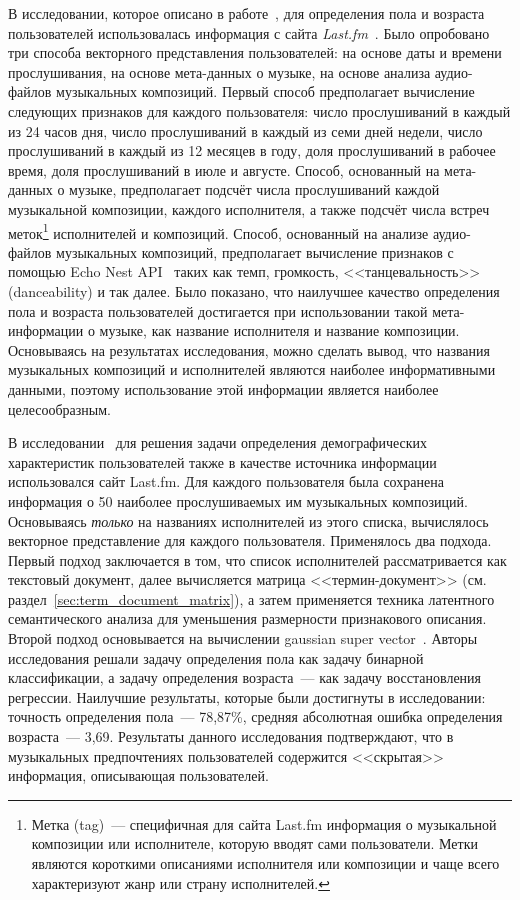 В исследовании, которое описано в работе~\cite{liu2012inferring},
для определения пола и возраста пользователей использовалась информация
с сайта \textit{Last.fm}~\cite{lastfm}. Было опробовано три
способа векторного представления пользователей: на основе даты и
времени прослушивания, на основе мета-данных о музыке, на основе
анализа аудио-файлов музыкальных композиций. Первый способ
предполагает вычисление следующих признаков для каждого пользователя:
число прослушиваний в каждый из 24 часов дня, число прослушиваний
в каждый из семи дней недели, число прослушиваний в каждый из 12 месяцев
в году, доля прослушиваний в рабочее время, доля прослушиваний в июле и августе.
Способ, основанный на мета-данных о музыке, предполагает подсчёт числа
прослушиваний каждой музыкальной композиции, каждого исполнителя, а также
подсчёт числа встреч меток\footnote{Метка (tag)~--- специфичная для сайта
Last.fm информация о музыкальной композиции или исполнителе, которую
вводят сами пользователи. Метки являются короткими описаниями исполнителя 
или композиции и чаще всего характеризуют жанр или страну
исполнителей.} исполнителей и композиций. Способ, основанный на анализе
аудио-файлов музыкальных композиций, предполагает вычисление признаков
с помощью Echo Nest API~\cite{echonest} таких как темп, громкость,
<<танцевальность>> (danceability) и так далее. Было показано, что
наилучшее качество определения пола и возраста пользователей 
достигается при использовании такой мета-информации о музыке, как
название исполнителя и название композиции. Основываясь на
результатах исследования, можно сделать вывод, что названия
музыкальных композиций и исполнителей являются наиболее
информативными данными, поэтому использование этой информации
является наиболее целесообразным.

В исследовании~\cite{wu2014gender} для решения задачи определения
демографических характеристик пользователей также в качестве
источника информации использовался сайт Last.fm. Для каждого
пользователя была сохранена информация о 50 наиболее
прослушиваемых им музыкальных композиций. Основываясь 
\textit{только} на названиях исполнителей из этого списка, 
вычислялось векторное представление для каждого пользователя.
Применялось два подхода. Первый подход заключается в том, что
список исполнителей рассматривается как текстовый документ,
далее вычисляется матрица <<термин-документ>> (см.
раздел~\ref{sec:term_document_matrix}), а затем применяется
техника латентного семантического анализа для уменьшения
размерности признакового описания. Второй подход основывается
на вычислении gaussian super vector~\cite{campbell2006support}.
Авторы исследования решали задачу определения пола как задачу
бинарной классификации, а задачу определения возраста~--- как
задачу восстановления регрессии. Наилучшие результаты, которые
были достигнуты в исследовании: точность определения пола~---
78,87\%, средняя абсолютная ошибка определения возраста~--- 3,69.
Результаты данного исследования подтверждают, что в музыкальных
предпочтениях пользователей содержится <<скрытая>> информация,
описывающая пользователей.

